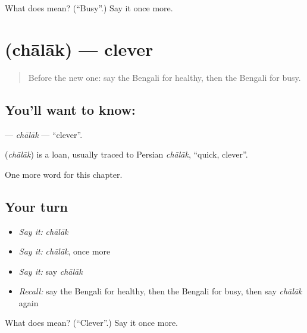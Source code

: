 \begin{tcolorbox}[breakable,colback=teal!4,colframe=teal!35!black,title={Before you move on}]
What does  mean? (\textquotedblleft{}Busy\textquotedblright{}.) Say it once more.
\end{tcolorbox}
\section[\texorpdfstring{\bn{চালাক} (chālāk)}{চালাক (chālāk)}]{ (chālāk) — clever}

\label{lesson:BN-C138-chalak}



\begin{quote}
Before the new one: say the Bengali for healthy, then the Bengali for busy.
\end{quote}

\subsection*{You'll want to know: }
\textbf{} — \emph{chālāk} — \textquotedblleft{}clever\textquotedblright{}.

\begin{cousinweb}
\textbf{} (\emph{chālāk}) is a loan, usually traced to Persian \emph{chālāk}, \textquotedblleft{}quick, clever\textquotedblright{}.
\end{cousinweb}

\begin{grammarlens}[title={What you've built}]
One more word for this chapter.
\end{grammarlens}

\subsection*{Your turn}
\begin{itemize}
\raggedright
  \item \emph{Say it:} \emph{chālāk}
  \item \emph{Say it:} \emph{chālāk}, once more
  \item \emph{Say it:} say \emph{chālāk}
  \item \emph{Recall:} say the Bengali for healthy, then the Bengali for busy, then say \emph{chālāk} again
\end{itemize}

\begin{tcolorbox}[breakable,colback=teal!4,colframe=teal!35!black,title={Before you move on}]
What does  mean? (\textquotedblleft{}Clever\textquotedblright{}.) Say it once more.
\end{tcolorbox}
